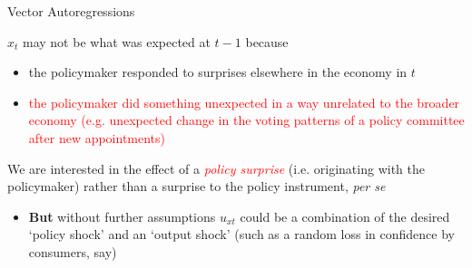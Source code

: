 
\begin{frame}{Vector Autoregressions}

$x_{t}$ may not be what was expected at $t-1$ because 
\begin{itemize}
\item	the policymaker responded to surprises elsewhere in the economy in $t$
\item	\textcolor{red}{the policymaker did something unexpected in a way unrelated to the broader economy (e.g. unexpected change in the voting patterns of a policy committee after new appointments)}
\end{itemize}

\vspace{2mm}
We are interested in the effect of a \textcolor{red}{\emph{policy surprise}} (i.e. originating with the policymaker) rather than a surprise to the policy instrument, \emph{per se}
\begin{itemize}
\item	\textbf{But} without further assumptions $u_{xt}$ could be a combination of the desired `policy shock' and an `output shock' (such as a random loss in confidence by consumers, say)
\end{itemize}

\end{frame}



